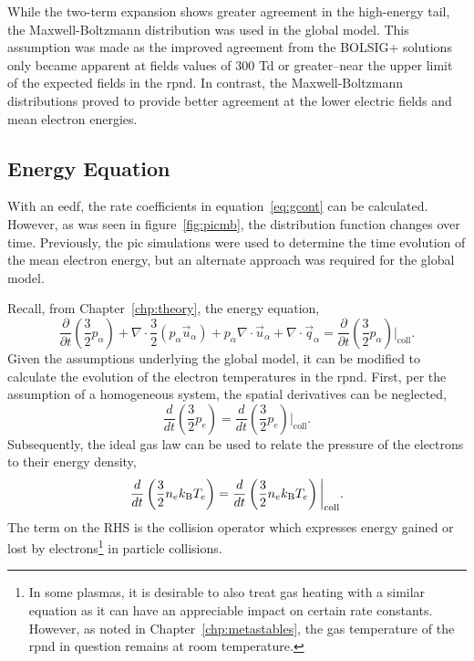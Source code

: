 While the two-term expansion shows greater agreement in the high-energy tail,
the Maxwell-Boltzmann distribution was used in the global model. This assumption
was made as the improved agreement from the BOLSIG+ solutions only became
apparent at fields values of 300 Td or greater--near the upper limit of the
expected fields in the \acs{rpnd}. In contrast, the Maxwell-Boltzmann
distributions proved to provide better agreement at the lower electric fields
and mean electron energies.

\subsection{Energy Equation}

With an \acs{eedf}, the rate coefficients in equation~\ref{eq:gcont} can be
calculated. However, as was seen in figure~\ref{fig:picmb}, the distribution
function changes over time. Previously, the \acs{pic} simulations were used to
determine the time evolution of the mean electron energy, but an alternate
approach was required for the global model.

Recall, from Chapter~\ref{chp:theory}, the energy equation,
\begin{equation}
  \frac{\partial}{\partial t}\left(\frac{3}{2}p_\alpha\right) 
  + \nabla\cdot\frac{3}{2} (p_\alpha\vec{u}_\alpha)
  + p_\alpha\nabla\cdot\vec{u}_\alpha
  + \nabla\cdot\vec{q}_\alpha
  = \frac{\partial}{\partial
  t}\left(\frac{3}{2}p_\alpha\right)\bigg|_\mathrm{coll}.
\end{equation}
Given the assumptions underlying the global model, it can be modified to
calculate the evolution of the electron temperatures in the \acs{rpnd}. First,
per the assumption of a homogeneous system, the spatial derivatives can be
neglected,
\begin{equation}
  \frac{d}{dt}\left(\frac{3}{2}p_e\right) =
  \frac{d}{dt}\left(\frac{3}{2}p_e\right)\bigg|_\mathrm{coll}.
\end{equation}
Subsequently, the ideal gas law can be used to relate the pressure of the
electrons to their energy density,
\begin{equation}
  \frac{d}{dt}\left(\frac{3}{2}n_ek_\mathrm{B} T_e \right) =
  \frac{d}{dt}\left(\frac{3}{2}n_ek_\mathrm{B} T_e \right)\bigg|_\mathrm{coll}.
  \label{eq:energy2}
\end{equation}
The term on the RHS is the collision operator which expresses energy gained or
lost by electrons\footnote{In some plasmas, it is desirable to also treat gas
heating with a similar equation as it can have an appreciable impact on certain
rate constants. However, as noted in Chapter~\ref{chp:metastables}, the gas
temperature of the \acs{rpnd} in question remains at room temperature.} in
particle collisions.

